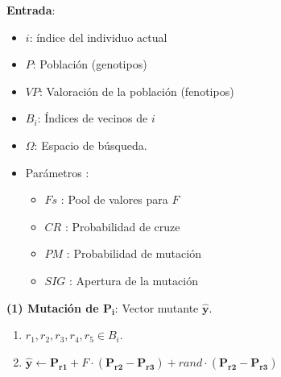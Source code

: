     \noindent\begin{minipage}{\textwidth}
    
        \begin{algorithm}[H]
    \SetAlgoLined
     \vspace{0.2cm}\textbf{Entrada}:
    \begin{multicols}{2}
     \begin{itemize}
         \vspace{0.15cm}\item $i$: índice del individuo actual 
         \vspace{0.15cm}\item $P$: Población (genotipos)
         \vspace{0.15cm}\item $VP$: Valoración de la población (fenotipos)
         \vspace{0.15cm}\item $B_i$: Índices de vecinos de $i$
         \vspace{0.15cm}\item $\Omega$: Espacio de búsqueda.
         \vspace{0.15cm}\item Parámetros : 
            \begin{itemize}
                \item $Fs$ : Pool de valores para $F$ 
                \item $CR$ : Probabilidad de cruze 
                \item $PM$ : Probabilidad de mutación
                \item $SIG$ : Apertura de la mutación 
            \end{itemize} 
     \end{itemize}
    \end{multicols}
    
    \begin{multicols}{2}
     \vspace{0.2cm} \textbf{(1) Mutación de $\boldsymbol{P_i}$}: Vector mutante $\boldsymbol{\hat{y}}$.
            \begin{enumerate}
                \item $r_1, r_2, r_3, r_4, r_5 \in B_i$.
                \item $\boldsymbol{\hat{y}} \gets \boldsymbol{P_{r1}} + F \cdot (\boldsymbol{P_{r2}} - \boldsymbol{P_{r3}}) + rand \cdot (\boldsymbol{P_{r2}} - \boldsymbol{P_{r3}}) $
            \end{enumerate}
            

\end{multicols}
\end{algorithm}
\end{minipage}
